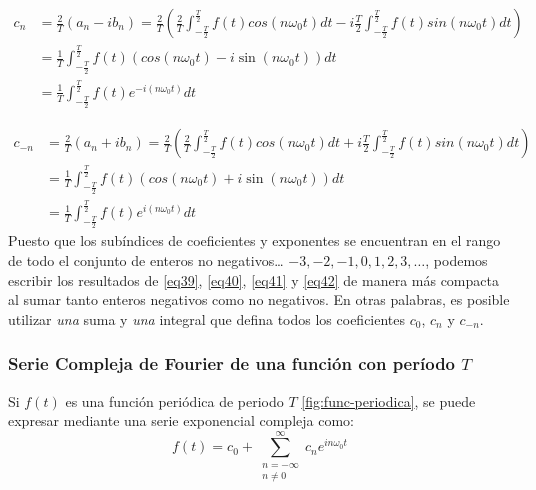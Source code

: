 \begin{equation} \label{eq41}
	\begin{split}
		c_n &= \frac{2}{T} \left(a_n - i b_n\right) = \frac{2}{T} \left(\frac{2}{T} \int_{-\frac{T}{2}}^{\frac{T}{2}} f(t) cos(n\omega_0 t)  dt - i \frac{T}{2} \int_{-\frac{T}{2}}^{\frac{T}{2}} f(t) sin(n\omega_0 t) dt\right) \\
		&=  \frac{1}{T} \int_{-\frac{T}{2}}^{\frac{T}{2}} f(t) \left( cos(n\omega_0 t)  - i \sin (n\omega_0 t)  \right) dt \\
		&= \frac{1}{T} \int_{-\frac{T}{2}}^{\frac{T}{2}} f(t) e^{-i (n\omega_0 t)}  dt		
	\end{split}
\end{equation}

\begin{equation} \label{eq42}
	\begin{split}
		c_{-n} &= \frac{2}{T} \left(a_n + i b_n\right) = \frac{2}{T} \left(\frac{2}{T} \int_{-\frac{T}{2}}^{\frac{T}{2}} f(t) cos(n\omega_0 t)  dt + i \frac{T}{2} \int_{-\frac{T}{2}}^{\frac{T}{2}} f(t) sin(n\omega_0 t) dt\right) \\
		&=  \frac{1}{T} \int_{-\frac{T}{2}}^{\frac{T}{2}} f(t) \left( cos(n\omega_0 t)  + i \sin (n\omega_0 t)  \right) dt \\
		&= \frac{1}{T} \int_{-\frac{T}{2}}^{\frac{T}{2}} f(t) e^{i (n\omega_0 t)}  dt		
	\end{split}
\end{equation}
Puesto que los subíndices de coeficientes y exponentes se encuentran en el rango de todo el conjunto de enteros no negativos… $-3, -2, -1, 0, 1, 2, 3, \dots$, podemos escribir los resultados de \eqref{eq39}, \eqref{eq40}, \eqref{eq41} y \eqref{eq42} de manera más compacta al sumar tanto enteros negativos como no negativos. En otras palabras, es posible utilizar \textit{una} suma y \textit{una} integral que defina todos los coeficientes $c_0$, $c_n$ y $c_{-n}$. ~\cite{matesAvanzadasZill}


\subsubsection{Serie Compleja de Fourier de una función con período $T$}
Si $f(t)$ es una función periódica de periodo $T$ \ref{fig:func-periodica}, se puede expresar mediante una serie exponencial compleja como: ~\cite{fourierHsu}
\begin{equation}\label{eq45}
	f(t) = c_0 + \sum_{\substack{n=-\infty \\ n \neq 0}}^{\infty} c_n e^{i n \omega_0 t}
\end{equation}


